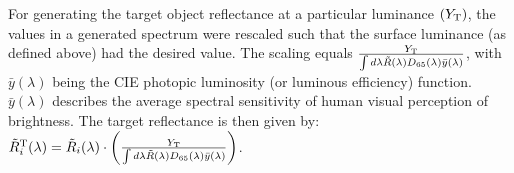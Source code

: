 \documentclass{jov}
\begin{document}

For generating the target object reflectance at a particular luminance $(Y_{\rm T})$, the values in a generated spectrum were 
rescaled such that the surface luminance (as defined above) had the desired value.
The scaling equals $\frac{Y_{\rm T}}{\int d\lambda \tilde{R}(\lambda) D_{65}(\lambda) \bar{y}(\lambda)}$, with $\bar{y}(\lambda)$ being the CIE photopic luminosity (or luminous efficiency) function. 
$\bar{y}(\lambda)$ describes the average spectral sensitivity of human visual 
perception of brightness. The target reflectance is then given by: $\tilde{R}^{\rm T}_i(\lambda) =\tilde{R}_i(\lambda) \cdot\left(\frac{Y_{\rm T}}{\int d\lambda \tilde{R}(\lambda) D_{65}(\lambda) \bar{y}(\lambda)}\right)$.
\end{document}
